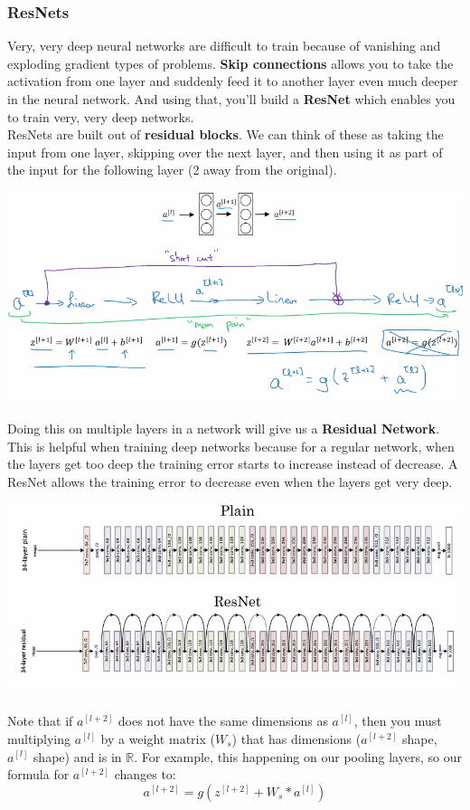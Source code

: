 \documentclass[11pt, a4paper]{article}
\begin{document}
\begin{spacing}{1.1}
	\subsubsection{ResNets}
	Very, very deep neural networks are difficult to train because of vanishing and exploding gradient types of problems.  \textbf{Skip connections} allows you to take the activation from one layer and suddenly feed it to another layer even much deeper in the neural network. And using that, you'll build a \textbf{ResNet} which enables you to train very, very deep networks. \vspace*{2mm}\\
	ResNets are built out of \textbf{residual blocks}. We can think of these as taking the input from one layer, skipping over the next layer, and then using it as part of the input for the following layer (2 away from the original).
	\begin{center}	\includegraphics[scale=.6]{res_net} 	\end{center}	
	Doing this on multiple layers in a network will give us a \textbf{Residual Network}. This is helpful when training deep networks because for a regular network, when the layers get too deep the training error starts to increase instead of decrease. A ResNet allows the training error to decrease even when the layers get very deep.
	\begin{center}	\includegraphics[scale=.6]{res_2} 	\end{center}
	Note that if $a^{[l+2]}$ does not have the same dimensions as $a^{[l]}$, then you must multiplying $a^{[l]}$ by a weight matrix ($W_s$) that has dimensions ($a^{[l+2]}$ shape, $a^{[l]}$ shape) and is in $\mathbb{R}$. For example, this happening on our pooling layers, so our formula for $a^{[l+2]}$ changes to: $$ a^{[l+2]} = g(z^{[l+2]} + W_s*a^{[l]}) $$ \newpage


\end{spacing}
\end{document}

